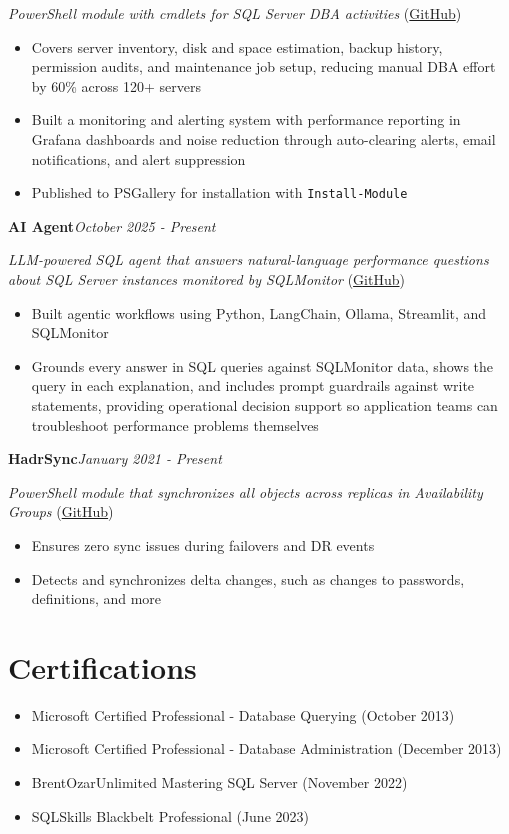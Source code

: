 \documentclass[10pt,a4paper]{article}
\begin{document}
\textit{PowerShell module with cmdlets for SQL Server DBA activities} (\href{https://github.com/imajaydwivedi/SQLDBATools}{GitHub})
\begin{itemize}
  \item Covers server inventory, disk and space estimation, backup history, permission audits, and maintenance job setup, reducing manual DBA effort by 60\% across 120+ servers
  \item Built a monitoring and alerting system with performance reporting in Grafana dashboards and noise reduction through auto-clearing alerts, email notifications, and alert suppression
  \item Published to PSGallery for installation with \texttt{Install-Module}
\end{itemize}
\vspace{14.7pt}
\noindent\textbf{AI Agent}\hfill \textit{October 2025 - Present}

\textit{LLM-powered SQL agent that answers natural-language performance questions about SQL Server instances monitored by SQLMonitor} (\href{https://github.com/imajaydwivedi/SQLMonitor/tree/dev/AI-Agent}{GitHub})
\begin{itemize}
  \item Built agentic workflows using Python, LangChain, Ollama, Streamlit, and SQLMonitor
  \item Grounds every answer in SQL queries against SQLMonitor data, shows the query in each explanation, and includes prompt guardrails against write statements, providing operational decision support so application teams can troubleshoot performance problems themselves
\end{itemize}
\vspace{14.7pt}
\noindent\textbf{HadrSync}\hfill \textit{January 2021 - Present}

\textit{PowerShell module that synchronizes all objects across replicas in Availability Groups} (\href{https://github.com/imajaydwivedi/HadrSync}{GitHub})
\begin{itemize}
  \item Ensures zero sync issues during failovers and DR events
  \item Detects and synchronizes delta changes, such as changes to passwords, definitions, and more
\end{itemize}

\section{Certifications}
\begin{itemize}
  \item Microsoft Certified Professional - Database Querying (October 2013)
  \item Microsoft Certified Professional - Database Administration (December 2013)
  \item BrentOzarUnlimited Mastering SQL Server (November 2022)
  \item SQLSkills Blackbelt Professional (June 2023)
\end{itemize}
\end{document}
